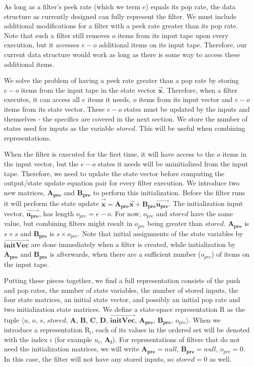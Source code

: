     As long as a filter's peek rate (which we term $e$) equals its pop
rate, the data structure as currently designed can fully represent
the filter. We must include additional modifications for a filter
with a peek rate greater than its pop rate. Note that such a
filter still removes $o$ items from its input tape upon every
execution, but it accesses $e-o$ additional items on its input
tape. Therefore, our current data structure would work as long as
there is some way to access these additional items.

    We solve the problem of having a peek rate greater than a pop
rate by storing $e-o$ items from the input tape in the state
vector $\vec{\mathbf{x}}$. Therefore, when a filter executes, it
can access all $e$ items it needs, $o$ items from its input vector
and $e-o$ items from its state vector. These $e-o$ states must be
updated by the inputs and themselves - the specifics are covered
in the next section. We store the number of states used for inputs
as the variable $stored$. This will be useful when combining
representations.

    When the filter is executed for the first time, it will have access
to the $o$ items in the input vector, but the $e-o$ states it
needs will be uninitialized from the input tape. Therefore, we
need to update the state vector before computing the output/state
update equation pair for every filter execution. We introduce two
new matrices, $\mathbf{A_{pre}}$ and $\mathbf{B_{pre}}$ to perform
this initialization. Before the filter runs it will perform the
state update $\vec{\dot{\mathbf{x}}} =
\mathbf{A_{pre}}\vec{\mathbf{x}} +
\mathbf{B_{pre}}\vec{\mathbf{u_{pre}}}$. The initialization input
vector, $\vec{\mathbf{u_{pre}}}$, has length $o_{pre} = e-o$. For
now, $o_{pre}$ and $stored$ have the same value, but combining
filters might result in $o_{pre}$ being greater than $stored$.
$\mathbf{A_{pre}}$ is $s \times s$ and $\mathbf{B_{pre}}$ is $s
\times o_{pre}$. Note that initial assignments of the state
variables by $\overrightarrow{\mathbf{initVec}}$ are done
immediately when a filter is created, while initialization by
$\mathbf{A_{pre}}$ and $\mathbf{B_{pre}}$ is afterwards, when
there are a sufficient number ($o_{pre}$) of items on the input
tape.

    Putting these pieces together, we find a full representation
consists of the push and pop rates, the number of state variables,
the number of stored inputs, the four state matrices, an initial
state vector, and possibly an initial pop rate and two
initialization state matrices. We define a state-space
representation $\mathrm{R}$ as the tuple $\langle$$u$, $o$, $s$,
$stored$, $\mathbf{A}$, $\mathbf{B}$, $\mathbf{C}$, $\mathbf{D}$,
$\overrightarrow{\mathbf{initVec}}$, $\mathbf{A_{pre}}$,
$\mathbf{B_{pre}}$, $o_{pre}$$\rangle$. When we introduce a
representation $\mathrm{R_i}$, each of its values in the ordered
set will be denoted with the index $i$ (for example $u_i$,
$\mathbf{A_i}$). For representations of filters that do not need
the initialization matrices, we will write $\mathbf{A_{pre}} =
null$, $\mathbf{B_{pre}} = null$, $o_{pre} = 0$. In this case, the
filter will not have any stored inputs, so $stored = 0$ as well.

